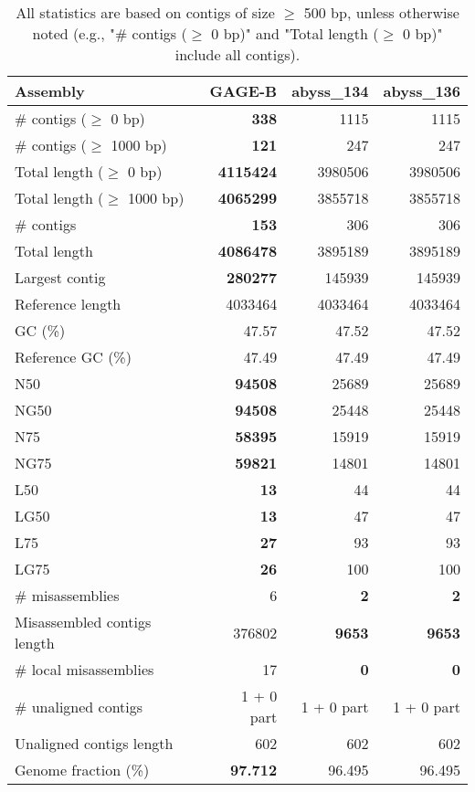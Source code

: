 \documentclass[12pt,a4paper]{article}
\begin{document}
\begin{table}[ht]
\begin{center}
\caption{All statistics are based on contigs of size $\geq$ 500 bp, unless otherwise noted (e.g., "\# contigs ($\geq$ 0 bp)" and "Total length ($\geq$ 0 bp)" include all contigs).}
\begin{tabular}{|l*{3}{|r}|}
\hline
Assembly & GAGE-B & abyss\_134 & abyss\_136 \\ \hline
\# contigs ($\geq$ 0 bp) & {\bf 338} & 1115 & 1115 \\ \hline
\# contigs ($\geq$ 1000 bp) & {\bf 121} & 247 & 247 \\ \hline
Total length ($\geq$ 0 bp) & {\bf 4115424} & 3980506 & 3980506 \\ \hline
Total length ($\geq$ 1000 bp) & {\bf 4065299} & 3855718 & 3855718 \\ \hline
\# contigs & {\bf 153} & 306 & 306 \\ \hline
Total length & {\bf 4086478} & 3895189 & 3895189 \\ \hline
Largest contig & {\bf 280277} & 145939 & 145939 \\ \hline
Reference length & 4033464 & 4033464 & 4033464 \\ \hline
GC (\%) & 47.57 & 47.52 & 47.52 \\ \hline
Reference GC (\%) & 47.49 & 47.49 & 47.49 \\ \hline
N50 & {\bf 94508} & 25689 & 25689 \\ \hline
NG50 & {\bf 94508} & 25448 & 25448 \\ \hline
N75 & {\bf 58395} & 15919 & 15919 \\ \hline
NG75 & {\bf 59821} & 14801 & 14801 \\ \hline
L50 & {\bf 13} & 44 & 44 \\ \hline
LG50 & {\bf 13} & 47 & 47 \\ \hline
L75 & {\bf 27} & 93 & 93 \\ \hline
LG75 & {\bf 26} & 100 & 100 \\ \hline
\# misassemblies & 6 & {\bf 2} & {\bf 2} \\ \hline
Misassembled contigs length & 376802 & {\bf 9653} & {\bf 9653} \\ \hline
\# local misassemblies & 17 & {\bf 0} & {\bf 0} \\ \hline
\# unaligned contigs & 1 + 0 part & 1 + 0 part & 1 + 0 part \\ \hline
Unaligned contigs length & 602 & 602 & 602 \\ \hline
Genome fraction (\%) & {\bf 97.712} & 96.495 & 96.495 \\ \hline

\end{tabular}
\end{center}
\end{table}
\end{document}
